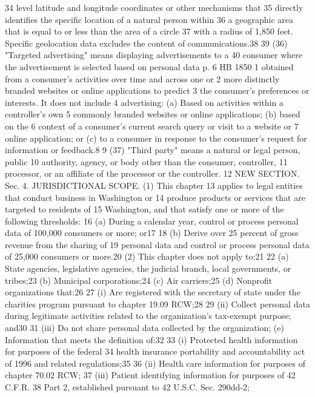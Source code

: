 34 level latitude and longitude coordinates or other mechanisms that
35 directly identifies the specific location of a natural person within
36 a geographic area that is equal to or less than the area of a circle
37 with a radius of 1,850 feet. Specific geolocation data excludes the
content of communications.38
39 (36) "Targeted advertising" means displaying advertisements to a
40 consumer where the advertisement is selected based on personal data
p. 6 HB 1850
1 obtained from a consumer's activities over time and across one or
2 more distinctly branded websites or online applications to predict
3 the consumer's preferences or interests. It does not include
4 advertising: (a) Based on activities within a controller's own
5 commonly branded websites or online applications; (b) based on the
6 context of a consumer's current search query or visit to a website or
7 online application; or (c) to a consumer in response to the
consumer's request for information or feedback.8
9 (37) "Third party" means a natural or legal person, public
10 authority, agency, or body other than the consumer, controller,
11 processor, or an affiliate of the processor or the controller.
12 NEW SECTION. Sec. 4. JURISDICTIONAL SCOPE. (1) This chapter
13 applies to legal entities that conduct business in Washington or
14 produce products or services that are targeted to residents of
15 Washington, and that satisfy one or more of the following thresholds:
16 (a) During a calendar year, control or process personal data of
100,000 consumers or more; or17
18 (b) Derive over 25 percent of gross revenue from the sharing of
19 personal data and control or process personal data of 25,000
consumers or more.20
(2) This chapter does not apply to:21
22 (a) State agencies, legislative agencies, the judicial branch,
local governments, or tribes;23
(b) Municipal corporations;24
(c) Air carriers;25
(d) Nonprofit organizations that:26
27 (i) Are registered with the secretary of state under the
charities program pursuant to chapter 19.09 RCW;28
29 (ii) Collect personal data during legitimate activities related
to the organization's tax-exempt purpose; and30
31 (iii) Do not share personal data collected by the organization;
(e) Information that meets the definition of:32
33 (i) Protected health information for purposes of the federal
34 health insurance portability and accountability act of 1996 and
related regulations;35
36 (ii) Health care information for purposes of chapter 70.02 RCW;
37 (iii) Patient identifying information for purposes of 42 C.F.R.
38 Part 2, established pursuant to 42 U.S.C. Sec. 290dd-2;
